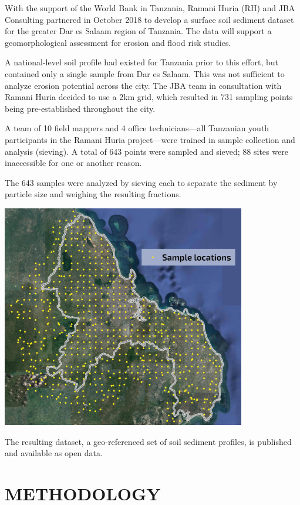 \documentclass[a4paper,12pt,twoside]{article}
\begin{document}
\color{RHgrey}
\begin{multicols}{2}
With the support of the World Bank in Tanzania, Ramani Huria (RH) and JBA Consulting partnered in October 2018 to develop a surface soil sediment dataset for the greater Dar es Salaam region of Tanzania. The data will support a geomorphological assessment for erosion and flood risk studies. 

A national-level soil profile had existed for Tanzania prior to this effort, but contained only a single sample from Dar es Salaam. This was not sufficient to analyze erosion potential across the city. The JBA team in consultation with Ramani Huria decided to use a 2km grid, which resulted in 731 sampling points being pre-established throughout the city.

A team of 10 field mappers and 4 office technicians---all Tanzanian youth participants in the Ramani Huria project---were trained in sample collection and analysis (sieving). A total of 643 points were sampled and sieved; 88 sites were inaccessible for one or another reason.

The 643 samples were analyzed by sieving each to separate the sediment by particle size and weighing the resulting fractions.

\end{multicols}

\includegraphics[width=0.8\textwidth]{sample_locations.jpg}

The resulting dataset, a geo-referenced set of soil sediment profiles, is published and available as open data.


\newpage
\color{RHblue}
\section{METHODOLOGY}
\label{methodology}
\end{document}
